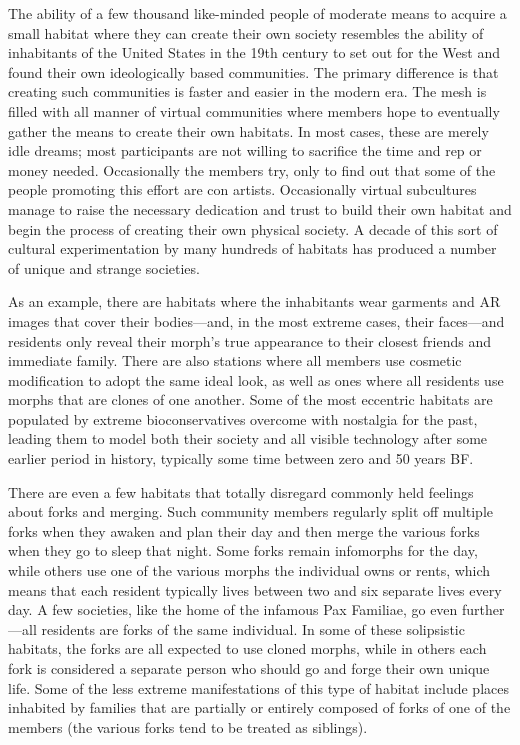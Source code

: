 The ability of a few thousand like-minded people of moderate means to
acquire a small habitat where they can create their own society
resembles the ability of inhabitants of the United States in the 19th
century to set out for the West and found their own ideologically
based communities. The primary difference is that creating such
communities is faster and easier in the modern era. The mesh is filled
with all manner of virtual communities where members hope to
eventually gather the means to create their own habitats. In most
cases, these are merely idle dreams; most participants are not willing
to sacrifice the time and rep or money needed. Occasionally the
members try, only to find out that some of the people promoting this
effort are con artists. Occasionally virtual subcultures manage to
raise the necessary dedication and trust to build their own habitat
and begin the process of creating their own physical society. A decade
of this sort of cultural experimentation by many hundreds of habitats
has produced a number of unique and strange societies.

As an example, there are habitats where the inhabitants wear garments
and AR images that cover their bodies—and, in the most extreme cases,
their faces—and residents only reveal their morph's true appearance to
their closest friends and immediate family. There are also stations
where all members use cosmetic modification to adopt the same ideal
look, as well as ones where all residents use morphs that are clones
of one another. Some of the most eccentric habitats are populated by
extreme bioconservatives overcome with nostalgia for the past, leading
them to model both their society and all visible technology after some
earlier period in history, typically some time between zero and 50
years BF.

There are even a few habitats that totally disregard commonly held
feelings about forks and merging.  Such community members regularly
split off multiple forks when they awaken and plan their day and then
merge the various forks when they go to sleep that night. Some forks
remain infomorphs for the day, while others use one of the various
morphs the individual owns or rents, which means that each resident
typically lives between two and six separate lives every day. A few
societies, like the home of the infamous Pax Familiae, go even
further—all residents are forks of the same individual. In some of
these solipsistic habitats, the forks are all expected to use cloned
morphs, while in others each fork is considered a separate person who
should go and forge their own unique life. Some of the less extreme
manifestations of this type of habitat include places inhabited by
families that are partially or entirely composed of forks of one of
the members (the various forks tend to be treated as siblings).

